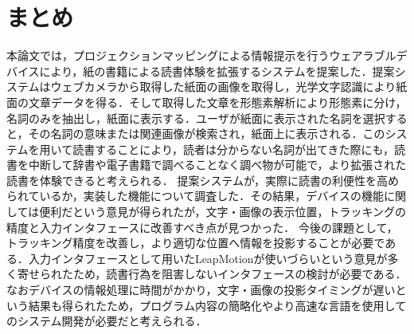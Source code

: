 \section{まとめ}

本論文では，プロジェクションマッピングによる情報提示を行うウェアラブルデバイスにより，紙の書籍による読書体験を拡張するシステムを提案した．提案システムはウェブカメラから取得した紙面の画像を取得し，光学文字認識により紙面の文章データを得る．そして取得した文章を形態素解析により形態素に分け，名詞のみを抽出し，紙面に表示する．ユーザが紙面に表示された名詞を選択すると，その名詞の意味または関連画像が検索され，紙面上に表示される．このシステムを用いて読書することにより，読者は分からない名詞が出てきた際にも，読書を中断して辞書や電子書籍で調べることなく調べ物が可能で，より拡張された読書を体験できると考えられる．
提案システムが，実際に読書の利便性を高められているか，実装した機能について調査した．その結果，デバイスの機能に関しては便利だという意見が得られたが，文字・画像の表示位置，トラッキングの精度と入力インタフェースに改善すべき点が見つかった．
今後の課題として，トラッキング精度を改善し，より適切な位置へ情報を投影することが必要である．入力インタフェースとして用いたLeapMotionが使いづらいという意見が多く寄せられたため，読書行為を阻害しないインタフェースの検討が必要である．なおデバイスの情報処理に時間がかかり，文字・画像の投影タイミングが遅いという結果も得られたため，プログラム内容の簡略化やより高速な言語を使用してのシステム開発が必要だと考えられる．
